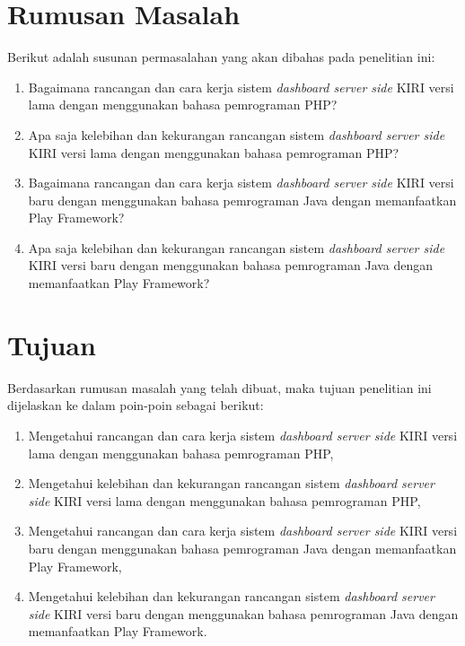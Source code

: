 \section{Rumusan Masalah}
\label{sec:rumusan_masalah}
	Berikut adalah susunan permasalahan yang akan dibahas pada penelitian ini:
	\begin{enumerate}
		\item Bagaimana rancangan dan cara kerja sistem \textit{dashboard server side}  KIRI versi lama dengan menggunakan bahasa pemrograman PHP?
		\item Apa saja kelebihan dan kekurangan rancangan sistem \textit{dashboard server side}  KIRI versi lama dengan menggunakan bahasa pemrograman PHP?
		\item Bagaimana rancangan dan cara kerja sistem \textit{dashboard server side}  KIRI versi baru dengan menggunakan bahasa pemrograman Java dengan memanfaatkan Play Framework?
		\item Apa saja kelebihan dan kekurangan rancangan sistem \textit{dashboard server side}  KIRI versi baru dengan menggunakan bahasa pemrograman Java dengan memanfaatkan Play Framework?
	\end{enumerate}

\section{Tujuan}
\label{sec:tujuan}
	Berdasarkan rumusan masalah yang telah dibuat, maka tujuan penelitian ini dijelaskan ke dalam poin-poin sebagai berikut:
	\begin{enumerate}
		\item Mengetahui rancangan dan cara kerja sistem \textit{dashboard server side}  KIRI versi lama dengan menggunakan bahasa pemrograman PHP,
		\item Mengetahui kelebihan dan kekurangan rancangan sistem \textit{dashboard server side}  KIRI versi lama dengan menggunakan bahasa pemrograman PHP,
		\item Mengetahui rancangan dan cara kerja sistem \textit{dashboard server side}  KIRI versi baru dengan menggunakan bahasa pemrograman Java dengan memanfaatkan Play Framework,
		\item Mengetahui kelebihan dan kekurangan rancangan sistem \textit{dashboard server side}  KIRI versi baru dengan menggunakan bahasa pemrograman Java dengan memanfaatkan Play Framework.
	\end{enumerate}
